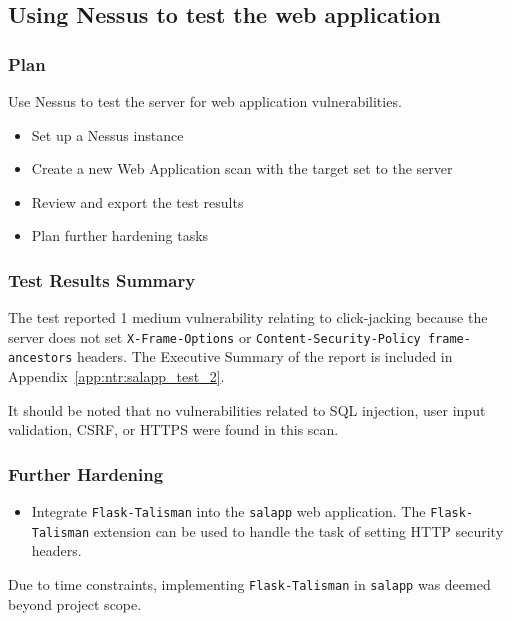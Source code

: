 \pagebreak
\subsection{Using Nessus to test the web application}
\subsubsection*{Plan}
Use Nessus to test the server for web application vulnerabilities.
\begin{itemize}
  \item Set up a Nessus instance
  \item Create a new Web Application scan with the target set to the server
  \item Review and export the test results
  \item Plan further hardening tasks
\end{itemize}
\subsubsection*{Test Results Summary}
The test reported 1 medium vulnerability relating to click-jacking because the server does not set \texttt{X-Frame-Options} or \texttt{Content-Security-Policy frame-ancestors} headers. The Executive Summary of the report is included in Appendix~\ref{app:ntr:salapp_test_2}.

It should be noted that no vulnerabilities related to SQL injection, user input validation, CSRF, or HTTPS were found in this scan.
\subsubsection*{Further Hardening}
\begin{itemize}
  \item Integrate \texttt{Flask-Talisman} into the \texttt{salapp} web application. The \texttt{Flask-Talisman} extension can be used to handle the task of setting HTTP security headers.
\end{itemize}

\noindent\textcolor{deep-gray}{Due to time constraints, implementing \texttt{Flask-Talisman} in \texttt{salapp} was deemed beyond project scope.}

%
%
%
